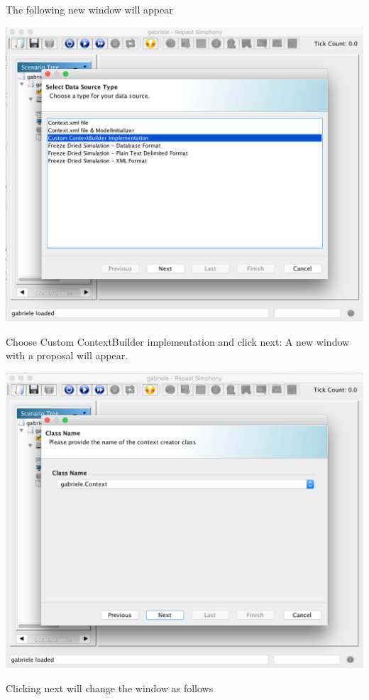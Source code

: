 \documentclass{book}
\begin{document}
The following new window will appear

\noindent
\includegraphics[scale=0.35]{fig_gabriele_rs_gui3}

Choose Custom ContextBuilder implementation and click next:
A new window with a proposal will appear. 

\noindent
\includegraphics[scale=0.35]{fig_gabriele_rs_gui4}

Clicking next will change the window as follows 
\end{document}
